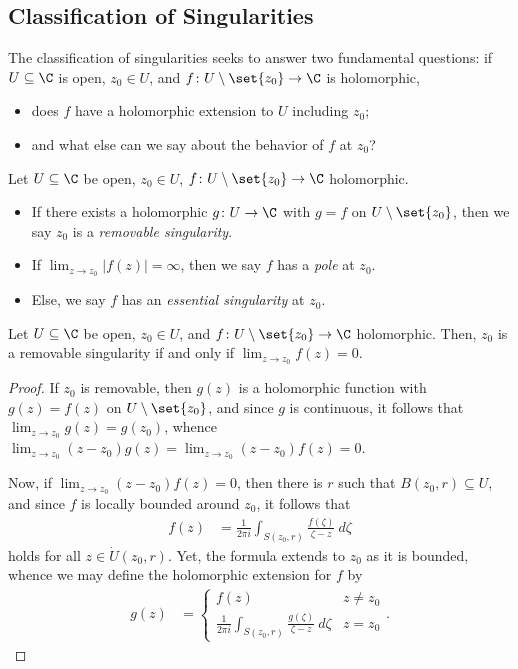 \documentclass[10pt]{mypackage}
\begin{document}
\subsection{Classification of Singularities}%
The classification of singularities seeks to answer two fundamental questions: if $U\subseteq \C$ is open, $z_0\in U$, and $f\colon U\setminus \set{z_0}\rightarrow \C$ is holomorphic, 
\begin{itemize}
  \item does $f$ have a holomorphic extension to $U$ including $z_0$;
  \item and what else can we say about the behavior of $f$ at $z_0$?
\end{itemize}
\begin{definition}
  Let $U\subseteq \C$ be open, $z_0\in U$, $f\colon U\setminus \set{z_0}\rightarrow \C$ holomorphic.
  \begin{itemize}
    \item If there exists a holomorphic $g\colon U\rightarrow \C$ with $g = f$ on $U\setminus \set{z_0}$, then we say $z_0$ is a \textit{removable singularity}.
    \item If $\lim_{z\rightarrow z_0} \left\vert f(z) \right\vert = \infty$, then we say $f$ has a \textit{pole} at $z_0$.
    \item Else, we say $f$ has an \textit{essential singularity} at $z_0$.
  \end{itemize}
\end{definition}
\begin{theorem}
  Let $U\subseteq \C$ be open, $z_0\in U$, and $f\colon U\setminus \set{z_0}\rightarrow \C$ holomorphic. Then, $z_0$ is a removable singularity if and only if $\lim_{z\rightarrow z_0}f(z) = 0$.
\end{theorem}
\begin{proof}
  If $z_0$ is removable, then $g(z)$ is a holomorphic function with $g(z) = f(z)$ on $U\setminus \set{z_0}$, and since $g$ is continuous, it follows that $\lim_{z\rightarrow z_0}g(z) = g\left(z_0\right)$, whence $\lim_{z\rightarrow z_0}\left( z-z_0 \right)g(z) = \lim_{z\rightarrow z_0}\left( z-z_0 \right)f(z) = 0$.%

  Now, if $\lim_{z\rightarrow z_0}\left( z-z_0 \right)f(z) = 0$, then there is $r$ such that $B\left( z_0,r \right)\subseteq U$, and since $f$ is locally bounded around $z_0$, it follows that
  \begin{align*}
    f(z) &= \frac{1}{2\pi i} \int_{S\left( z_0,r \right)}^{} \frac{f\left( \zeta \right)}{\zeta - z}\:d\zeta
  \end{align*}
  holds for all $z\in \dot{U}\left( z_0,r \right)$. Yet, the formula extends to $z_0$ as it is bounded, whence we may define the holomorphic extension for $f$ by
  \begin{align*}
    g\left( z \right) &= \begin{cases}
      f(z) & z\neq z_0\\
      \frac{1}{2\pi i} \int_{S\left( z_0,r \right)}^{} \frac{g\left( \zeta \right)}{\zeta - z}\:d\zeta & z= z_0
    \end{cases}.
  \end{align*}
\end{proof}
\end{document}
